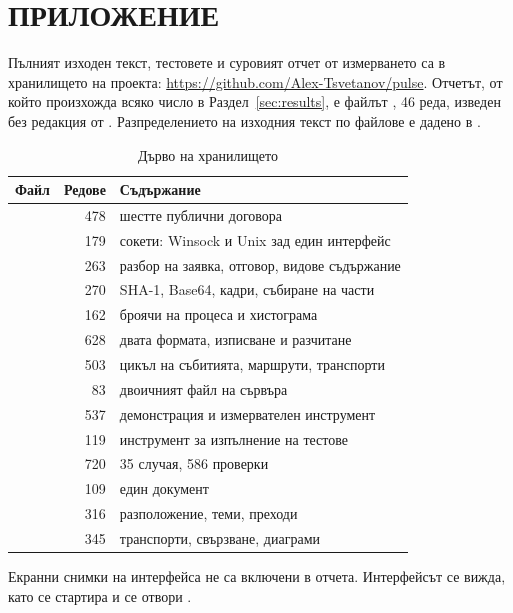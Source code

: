 \section*{ПРИЛОЖЕНИЕ}
\label{sec:appendix}

Пълният изходен текст, тестовете и суровият отчет от измерването са в хранилището на
проекта: \url{https://github.com/Alex-Tsvetanov/pulse}. Отчетът, от който произхожда всяко
число в Раздел~\ref{sec:results}, е файлът , 46 реда, изведен
без редакция от . Разпределението на изходния текст по файлове е
дадено в .

\begin{table}[H]
\caption{Дърво на хранилището}
\label{tab:tree}
\centering
\fontsize{11}{13.2}\selectfont
\begin{tabular}{@{}L{4.3cm}rL{7.0cm}@{}}
\toprule
\textbf{Файл} & \textbf{Редове} & \textbf{Съдържание} \\
\midrule
{} & 478 & шестте публични договора \\
 & 179 & сокети: Winsock и Unix зад един интерфейс \\
 & 263 & разбор на заявка, отговор, видове съдържание \\
 & 270 & SHA-1, Base64, кадри, събиране на части \\
 & 162 & броячи на процеса и хистограма \\
 & 628 & двата формата, изписване и разчитане \\
 & 503 & цикъл на събитията, маршрути, транспорти \\
 & 83 & двоичният файл на сървъра \\
 & 537 & демонстрация и измервателен инструмент \\
 & 119 & инструмент за изпълнение на тестове \\
 & 720 & 35 случая, 586 проверки \\
 & 109 & един документ \\
 & 316 & разположение, теми, преходи \\
 & 345 & транспорти, свързване, диаграми \\
\bottomrule
\end{tabular}
\end{table}

Екранни снимки на интерфейса не са включени в отчета. Интерфейсът се вижда, като се стартира
 и се отвори .
